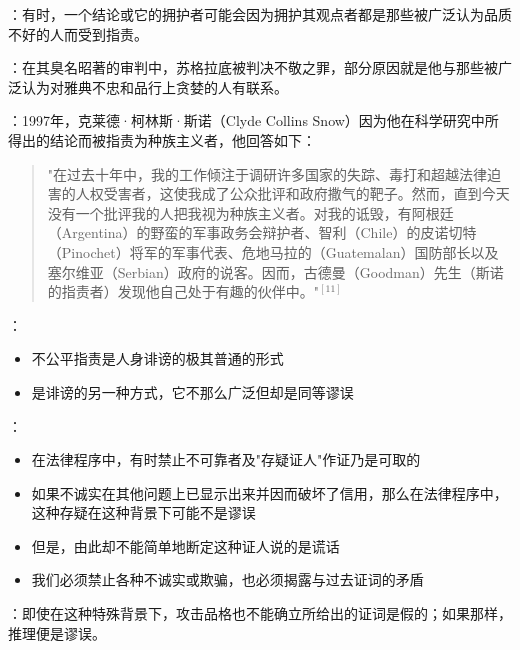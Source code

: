 \begin{theorembox}[title=连带罪恶与证人可信度]
：有时，一个结论或它的拥护者可能会因为拥护其观点者都是那些被广泛认为品质不好的人而受到指责。

：在其臭名昭著的审判中，苏格拉底被判决不敬之罪，部分原因就是他与那些被广泛认为对雅典不忠和品行上贪婪的人有联系。

：1997年，克莱德·柯林斯·斯诺（Clyde Collins Snow）因为他在科学研究中所得出的结论而被指责为种族主义者，他回答如下：

\begin{quote}
"在过去十年中，我的工作倾注于调研许多国家的失踪、毒打和超越法律迫害的人权受害者，这使我成了公众批评和政府撒气的靶子。然而，直到今天没有一个批评我的人把我视为种族主义者。对我的诋毁，有阿根廷（Argentina）的野蛮的军事政务会辩护者、智利（Chile）的皮诺切特（Pinochet）将军的军事代表、危地马拉的（Guatemalan）国防部长以及塞尔维亚（Serbian）政府的说客。因而，古德曼（Goodman）先生（斯诺的指责者）发现他自己处于有趣的伙伴中。"$^{[11]}$
\end{quote}

：
\begin{itemize}
  \item 不公平指责是人身诽谤的极其普通的形式
  \item {}是诽谤的另一种方式，它不那么广泛但却是同等谬误
\end{itemize}

：
\begin{itemize}
  \item 在法律程序中，有时禁止不可靠者及"存疑证人"作证乃是可取的
  \item 如果不诚实在其他问题上已显示出来并因而破坏了信用，那么在法律程序中，这种存疑在这种背景下可能不是谬误
  \item 但是，由此却不能简单地断定这种证人说的是谎话
  \item 我们必须禁止各种不诚实或欺骗，也必须揭露与过去证词的矛盾
\end{itemize}

：即使在这种特殊背景下，攻击品格也不能确立所给出的证词是假的；如果那样，推理便是谬误。
\end{theorembox}

